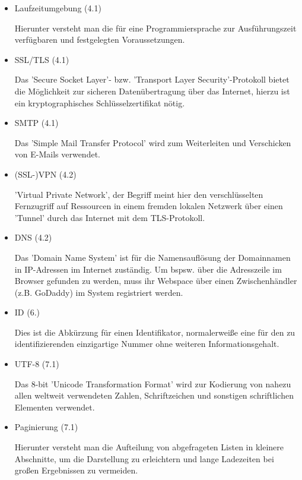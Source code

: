 \documentclass{article}
\begin{document}
\begin{itemize}
\item Laufzeitumgebung (4.1)
\begin{flushleft}
Hierunter versteht man die für eine Programmiersprache zur Ausführungszeit verfügbaren und festgelegten Voraussetzungen.
\end{flushleft}

\item SSL/TLS (4.1)
\begin{flushleft}
Das 'Secure Socket Layer'- bzw. 'Transport Layer Security'-Protokoll bietet die Möglichkeit zur sicheren Datenübertragung über das Internet, hierzu ist ein kryptographisches Schlüsselzertifikat nötig.
\end{flushleft}

\item SMTP (4.1)
\begin{flushleft}
Das 'Simple Mail Transfer Protocol' wird zum Weiterleiten und Verschicken von E-Mails verwendet.
\end{flushleft}

\item (SSL-)VPN (4.2)
\begin{flushleft}
'Virtual Private Network', der Begriff meint hier den verschlüsselten Fernzugriff auf Ressourcen in einem fremden lokalen Netzwerk über einen 'Tunnel' durch das Internet mit dem TLS-Protokoll.
\end{flushleft}

\item DNS (4.2)
\begin{flushleft}
Das 'Domain Name System' ist für die Namensauflösung der Domainnamen in IP-Adressen im Internet zuständig. Um bspsw. über die Adresszeile im Browser gefunden zu werden, muss ihr Webspace über einen Zwischenhändler (z.B. GoDaddy) im System registriert werden.
\end{flushleft}

\item ID (6.)
\begin{flushleft}
Dies ist die Abkürzung für einen Identifikator, normalerweiße eine für den zu identifizierenden einzigartige Nummer ohne weiteren Informationsgehalt.
\end{flushleft}

\item UTF-8 (7.1)
\begin{flushleft}
Das 8-bit 'Unicode Transformation Format' wird zur Kodierung von nahezu allen weltweit verwendeten Zahlen, Schriftzeichen und sonstigen schriftlichen Elementen verwendet.
\end{flushleft}

\item Paginierung (7.1)
\begin{flushleft}
Hierunter versteht man die Aufteilung von abgefrageten Listen in kleinere Abschnitte, um die Darstellung zu erleichtern und lange Ladezeiten bei großen Ergebnissen zu vermeiden.
\end{flushleft}

\end{itemize}
\end{document}
